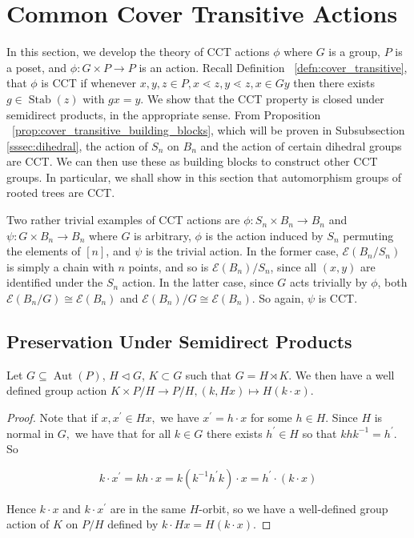 \documentclass[smallextended, envcountsame, numbook]{svjour3}
\numberwithin{equation}{section}
\newcommand\ssec{\subsection}
\newcommand\Stab{\operatorname{Stab}}
\newcommand\Aut{\operatorname{Aut}}
\begin{document}

\section{Common Cover Transitive Actions}
\label{sec:cover_transitive}
In this section, we develop the theory of CCT actions $\phi$ where $G$ is a group, $P$ is a poset, and $\phi:G\times P \rightarrow P$ is an action. Recall Definition ~\ref{defn:cover_transitive}, that $\phi$ is CCT if whenever $x,y,z \in P,x\lessdot z,y\lessdot z,x \in Gy$ then there exists $g \in \Stab(z)$ with $gx = y$.  We show that the CCT property is closed under semidirect products, in the appropriate sense. From Proposition ~\ref{prop:cover_transitive_building_blocks}, which will be proven in Subsubsection \ref{sssec:dihedral}, the action of $S_n$ on $B_n$ and the action of certain dihedral groups are CCT. We can then use these as building blocks to construct other CCT groups. In particular, we shall show in this section that automorphism groups of rooted trees are CCT.

\begin{example}
\label{eg:trivial_edgequot}
Two rather trivial examples of CCT actions are $\phi\colon S_n\times B_n \rightarrow B_n$ and $\psi\colon G\times B_n\rightarrow B_n$ where $G$ is arbitrary, $\phi$ is the action induced by $S_n$ permuting the elements of $[n]$, and $\psi$ is the trivial action. In the former case, $\mathcal E(B_n/S_n)$ is simply a chain with $n$ points, and so is $\mathcal E(B_n)/S_n$, since all $(x, y)$ are identified under the $S_n$ action. In the latter case, since $G$ acts trivially by $\phi$, both  $\mathcal E(B_n/G) \cong \mathcal E(B_n)$ and $\mathcal E(B_n)/G \cong \mathcal E(B_n)$. So again, $\psi$ is CCT.
\end{example}

\ssec{Preservation Under Semidirect Products}
\label{ssec:semidirect_product_preservation}

\begin{lemma}
Let $G\subseteq\Aut(P)$, $H\triangleleft G$, $K\subset G$ such that $G = H\rtimes K$. We then have a well defined group action $K \times P/H \rightarrow P/H,(k,Hx) \mapsto H(k \cdot x)$.

\end{lemma}
\begin{proof}

Note that if $x,x^\prime\in Hx,$ we have $x^\prime = h\cdot x$ for some $h\in H$. Since $H$ is normal in $G,$ we have that for all $k \in G$ there exists $h^\prime \in H$ so that $khk^{-1} = h^\prime$. So 

$$k\cdot x^\prime = kh\cdot x = k(k^{-1}h^\prime k)\cdot x = h^\prime\cdot (k\cdot x)$$

Hence $k\cdot x$ and $k\cdot x^\prime$ are in the same $H$-orbit, so we have a well-defined group action of $K$ on $P/H$ defined by $k\cdot Hx = H(k\cdot x)$.
\end{proof}
\end{document}
